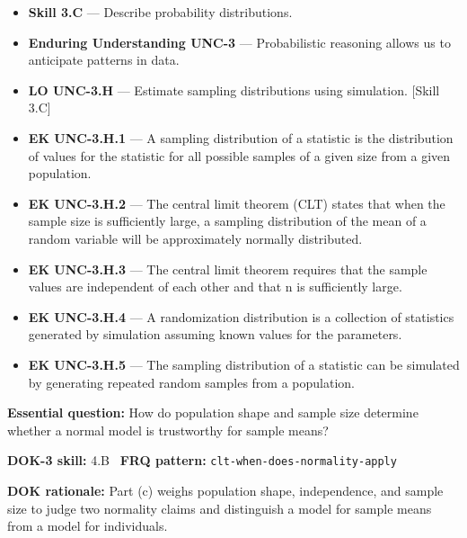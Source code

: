 \documentclass[11pt]{article}
\begin{document}


{\small
\begin{itemize}[leftmargin=1.5em,itemsep=2pt,topsep=2pt]
  \item \textbf{Skill 3.C} --- Describe probability distributions.
  \item \textbf{Enduring Understanding UNC-3} --- Probabilistic reasoning allows us to anticipate patterns in data.
  \item \textbf{LO UNC-3.H} --- Estimate sampling distributions using simulation. [Skill 3.C]
  \item \textbf{EK UNC-3.H.1} --- A sampling distribution of a statistic is the distribution of values for the statistic for all possible samples of a given size from a given population.
  \item \textbf{EK UNC-3.H.2} --- The central limit theorem (CLT) states that when the sample size is sufficiently large, a sampling distribution of the mean of a random variable will be approximately normally distributed.
  \item \textbf{EK UNC-3.H.3} --- The central limit theorem requires that the sample values are independent of each other and that n is sufficiently large.
  \item \textbf{EK UNC-3.H.4} --- A randomization distribution is a collection of statistics generated by simulation assuming known values for the parameters.
  \item \textbf{EK UNC-3.H.5} --- The sampling distribution of a statistic can be simulated by generating repeated random samples from a population.
\end{itemize}
}
\textbf{Essential question:} How do population shape and sample size determine whether a normal model is trustworthy for sample means?\par
\textbf{DOK-3 skill:} 4.B \textperiodcentered\ \textbf{FRQ pattern:} {\small\texttt{clt-\allowbreak{}when-\allowbreak{}does-\allowbreak{}normality-\allowbreak{}apply}}\par
\textbf{DOK rationale:} Part (c) weighs population shape, independence, and sample size to judge two normality claims and distinguish a model for sample means from a model for individuals.\par
\end{document}
